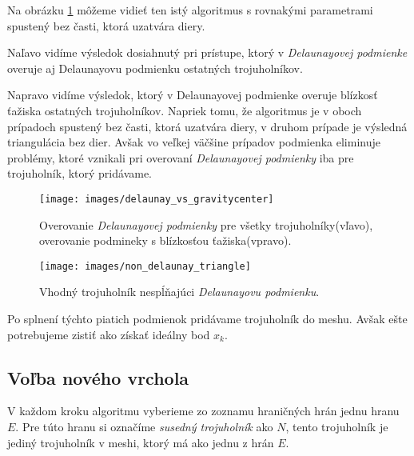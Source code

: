 \begin{enumerate}
{         Na obrázku \ref{obr:delaunay_vs_gravitycenter} môžeme vidieť ten 
         istý algoritmus s rovnakými parametrami spustený bez časti, ktorá uzatvára diery. 
         
         Naľavo vidíme výsledok dosiahnutý pri prístupe, ktorý v \textit{Delaunayovej podmienke} overuje aj
         Delaunayovu podmienku ostatných trojuholníkov. 
         
         Napravo vidíme výsledok, ktorý v Delaunayovej
         podmienke overuje blízkosť ťažiska ostatných trojuholníkov. Napriek tomu, že algoritmus
         je v oboch prípadoch spustený bez časti, ktorá uzatvára diery, v druhom prípade je výsledná 
         triangulácia bez dier. Avšak vo veľkej väčšine prípadov podmienka eliminuje problémy, 
         ktoré vznikali pri overovaní \textit{Delaunayovej podmienky} iba pre trojuholník, ktorý pridávame.
     }

    \begin{figure}
        \centerline{\texttt{[image: images/delaunay\_vs\_gravitycenter]}}
        \caption[Delaunayova podmienka verzus podmienka overujúca blízkosť ťažiska]
        {Overovanie \textit{Delaunayovej podmienky} pre všetky trojuholníky(vľavo), overovanie
        podmineky s blízkosťou ťažiska(vpravo).}
        \label{obr:delaunay_vs_gravitycenter}
    \end{figure}

    \begin{figure}
        \centerline{\texttt{[image: images/non\_delaunay\_triangle]}}
        \caption[Trojuholník nespĺňajúci \textit{Delaunayovu podmienku}]{Vhodný trojuholník nespĺňajúci \textit{Delaunayovu podmienku}.}
        \label{obr:non_delaunay_triangle}
    \end{figure}
\end{enumerate}

Po splnení týchto piatich podmienok pridávame trojuholník do meshu. Avšak ešte potrebujeme zistiť 
ako získať ideálny bod $x_k$.

\subsection{Voľba nového vrchola}
\label{kap:finding_new_vertex}

V každom kroku algoritmu vyberieme zo zoznamu hraničných hrán jednu hranu $E$. Pre túto hranu si 
označíme \textit{susedný trojuholník} ako $N$, tento trojuholník je jediný trojuholník v meshi, 
ktorý má ako jednu z hrán $E$. 

